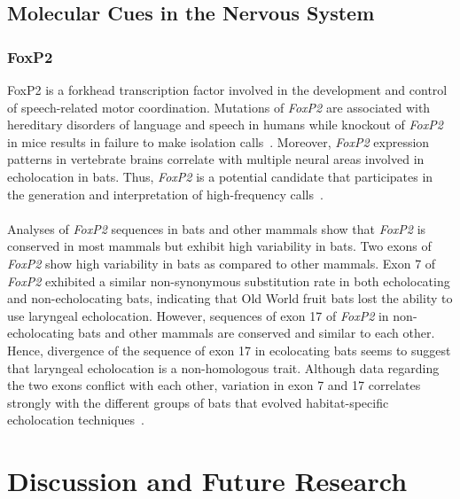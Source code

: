 \documentclass[11pt]{article}
\begin{document}
\subsection{Molecular Cues in the Nervous System}

\subsubsection{FoxP2}
FoxP2 is a forkhead transcription factor involved in the development and control of speech-related motor coordination. Mutations of \textit{FoxP2} are associated with hereditary disorders of language and speech in humans while knockout of \textit{FoxP2} in mice results in failure to make isolation calls~\citep{Li2007a, Teeling2009}. Moreover, \textit{FoxP2} expression patterns in vertebrate brains correlate with multiple neural areas involved in echolocation in bats. Thus, \textit{FoxP2} is a potential candidate that participates in the generation and interpretation of high-frequency calls~\citep{Li2007a}. 
\\
\\
Analyses of \textit{FoxP2} sequences in bats and other mammals show that \textit{FoxP2} is conserved in most mammals but exhibit high variability in bats. Two exons of \textit{FoxP2} show high variability in bats as compared to other mammals. Exon 7 of \textit{FoxP2} exhibited a similar non-synonymous substitution rate in both echolocating and non-echolocating bats, indicating that Old World fruit bats lost the ability to use laryngeal echolocation. However, sequences of exon 17 of \textit{FoxP2} in non-echolocating bats and other mammals are conserved and similar to each other. Hence, divergence of the sequence of exon 17 in ecolocating bats seems to suggest that laryngeal echolocation is a non-homologous trait. Although data regarding the two exons conflict with each other, variation in exon 7 and 17 correlates strongly with the different groups of bats that evolved habitat-specific echolocation techniques~\citep{Li2007a}.
\\
\section{Discussion and Future Research}
\end{document}
